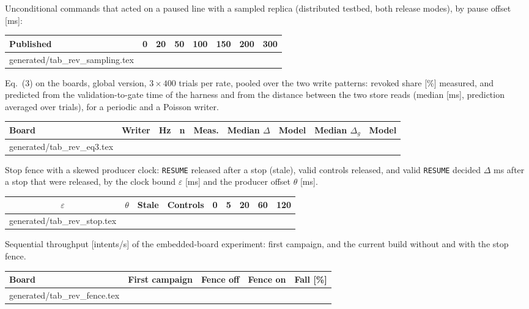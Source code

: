 \documentclass[11pt]{article}
\makeatletter
\newcommand{\gen}[1]{\@@input generated/#1.tex }
\makeatother
\begin{document}
Unconditional commands that acted on a paused line with a sampled replica (distributed testbed, both release modes), by pause offset [ms]:

\begin{center}\footnotesize\setlength{\tabcolsep}{3.5pt}
\begin{tabular}{@{}lccccccc@{}}
\toprule
\textbf{Published} & 0 & 20 & 50 & 100 & 150 & 200 & 300 \\
\midrule
\gen{tab_rev_sampling}
\bottomrule
\end{tabular}\end{center}

Eq.~(3) on the boards, global version, $3\times400$ trials per rate, pooled over the two write patterns: revoked share [\%] measured, and predicted from the
validation-to-gate time of the harness and from the distance between the two store reads (median [ms], prediction averaged over trials), for a periodic and a
Poisson writer.

\begin{center}\footnotesize\setlength{\tabcolsep}{3.5pt}
\begin{tabular}{@{}llccccccc@{}}
\toprule
\textbf{Board} & \textbf{Writer} & \textbf{Hz} & \textbf{n} & \textbf{Meas.} & \textbf{Median $\Delta$} & \textbf{Model} & \textbf{Median $\Delta_g$} & \textbf{Model} \\
\midrule
\gen{tab_rev_eq3}
\bottomrule
\end{tabular}\end{center}

Stop fence with a skewed producer clock: \texttt{RESUME} released after a stop (stale), valid controls released, and valid \texttt{RESUME} decided $\Delta$ ms after a stop that were released, by the clock bound $\varepsilon$ [ms] and the producer offset $\theta$ [ms].

\begin{center}\footnotesize\setlength{\tabcolsep}{3.5pt}
\begin{tabular}{@{}ccccccccc@{}}
\toprule
$\varepsilon$ & $\theta$ & Stale & Controls & 0 & 5 & 20 & 60 & 120 \\
\midrule
\gen{tab_rev_stop}
\bottomrule
\end{tabular}\end{center}

Sequential throughput [intents/s] of the embedded-board experiment: first campaign, and the current build without and with the stop fence.

\begin{center}\footnotesize\setlength{\tabcolsep}{3.5pt}
\begin{tabular}{@{}lcccc@{}}
\toprule
Board & First campaign & Fence off & Fence on & Fall [\%] \\
\midrule
\gen{tab_rev_fence}
\bottomrule
\end{tabular}\end{center}
\end{document}
